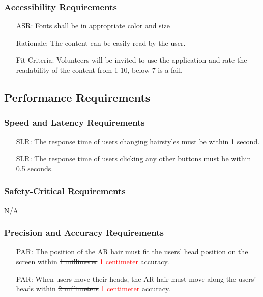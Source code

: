 \documentclass[12pt]{article}
\newcounter{reqnum} %
\newcounter{arreqnum} %
\newcounter{lrreqnum} %
\newcounter{asrreqnum} %
\newcounter{slrreqnum} %
\newcounter{parreqnum} %
\begin{document}
\subsubsection{Accessibility Requirements}
\begin{itemize}
    \item[ASR\refstepcounter{asrreqnum}\theasrreqnum \label{R_Inputs}:] Fonts shall be in appropriate color and size
    \item[] Rationale: The content can be easily read by the user.
    \item[] Fit Criteria: Volunteers will be invited to use the application and rate the readability of the content from 1-10, below 7 is a fail.
\end{itemize}


\subsection{Performance Requirements}
\subsubsection{Speed and Latency Requirements}
\begin{itemize}
    \item[SLR\refstepcounter{slrreqnum}\theslrreqnum \label{R_Inputs}:] The response time of users changing hairstyles must be within 1 second.
    \item[SLR\refstepcounter{slrreqnum}\theslrreqnum \label{R_Inputs}:] The response time of users clicking any other buttons must be within 0.5 seconds.
\end{itemize}

\subsubsection{Safety-Critical Requirements}
N/A

\subsubsection{Precision and Accuracy Requirements}
\begin{itemize}
    \item[PAR\refstepcounter{parreqnum}\theparreqnum \label{R_Inputs}:] The position of the AR hair must fit the users' head position on the screen within \sout{1 millimeter} \textcolor{red}{1 centimeter} accuracy.
    \item[PAR\refstepcounter{parreqnum}\theparreqnum \label{R_Inputs}:] When users move their heads, the AR hair must move along the users' heads within \sout{2 millimeters} \textcolor{red}{1 centimeter} accuracy.
\end{itemize}
\end{document}
